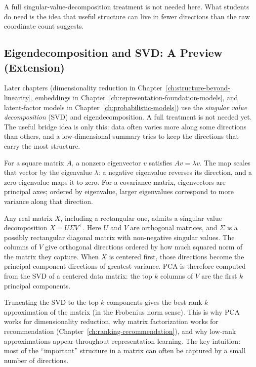 A full singular-value-decomposition treatment is not needed here. What students do need is the idea that useful structure can live in fewer directions than the raw coordinate count suggests.

\subsection*{Eigendecomposition and SVD: A Preview (Extension)}

Later chapters (dimensionality reduction in Chapter~\ref{ch:structure-beyond-linearity}, embeddings in Chapter~\ref{ch:representation-foundation-models}, and latent-factor models in Chapter~\ref{ch:probabilistic-models}) use the \emph{singular value decomposition} (SVD) and eigendecomposition. A full treatment is not needed yet. The useful bridge idea is only this: data often varies more along some directions than others, and a low-dimensional summary tries to keep the directions that carry the most structure.

For a square matrix $A$, a nonzero eigenvector $v$ satisfies $Av=\lambda v$. The map scales that vector by the eigenvalue $\lambda$: a negative eigenvalue reverses its direction, and a zero eigenvalue maps it to zero. For a covariance matrix, eigenvectors are principal axes; ordered by eigenvalue, larger eigenvalues correspond to more variance along that direction.

Any real matrix $X$, including a rectangular one, admits a singular value decomposition $X=U\Sigma V^\top$. Here $U$ and $V$ are orthogonal matrices, and $\Sigma$ is a possibly rectangular diagonal matrix with non-negative singular values. The columns of $V$ give orthogonal directions ordered by how much squared norm of the matrix they capture. When $X$ is centered first, those directions become the principal-component directions of greatest variance. PCA is therefore computed from the SVD of a centered data matrix: the top $k$ columns of $V$ are the first $k$ principal components.

Truncating the SVD to the top $k$ components gives the best rank-$k$ approximation of the matrix (in the Frobenius norm sense). This is why PCA works for dimensionality reduction, why matrix factorization works for recommendation (Chapter~\ref{ch:ranking-recommendation}), and why low-rank approximations appear throughout representation learning. The key intuition: most of the ``important'' structure in a matrix can often be captured by a small number of directions.

